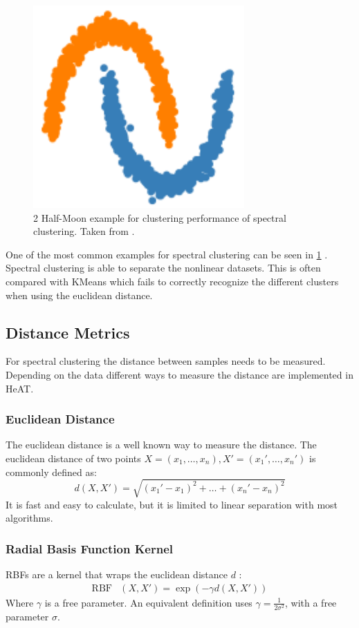 \begin{figure}
  \includegraphics{images/spectral_example.png}
  \caption{2 Half-Moon example for clustering performance of spectral clustering. Taken from \cite{noauthor_23_2020}.}
  \label{fig:spectral_example}
\end{figure}

One of the most common examples for spectral clustering can be seen in \cref{fig:spectral_example} \cite{noauthor_23_2020}. Spectral clustering is able to
separate the nonlinear datasets. This is often compared with KMeans which fails to correctly recognize the different clusters when using the euclidean distance.

\subsection{Distance Metrics}
\label{subsec:distance_metrics}
For spectral clustering the distance between samples needs to be measured. Depending on the data different ways to measure the distance are implemented in \gls{HeAT}.

\subsubsection{Euclidean Distance}
The euclidean distance is a well known way to measure the distance. The euclidean distance of two points \(X = (x_1, \ldots, x_n ), X' = (x_1', \ldots, x_n')\) is commonly defined  as:
\[
  d\left(X, X'\right) = \sqrt{{(x_1' - x_1)}^2 + \ldots + {(x_n' - x_n)}^2}
\]
It is fast and easy to calculate, but it is limited to  linear separation with most algorithms.

\subsubsection{Radial Basis Function Kernel}
\glspl{RBF} are a kernel that wraps the euclidean distance \(d\) \cite{vert_primer_2004}:
\begin{align*}
  \mathop{RBF} & \left(X, X'\right) = \exp(-\gamma d(X, X'))
\end{align*}
Where \(\gamma\) is a free parameter. An equivalent definition uses \(\gamma = \frac{1}{2\sigma^2}\), with a free parameter \(\sigma\).

